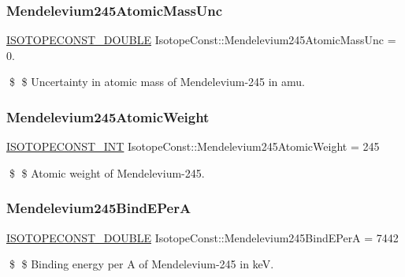 \subsubsection{\texorpdfstring{Mendelevium245\+Atomic\+Mass\+Unc}{Mendelevium245AtomicMassUnc}}
{\footnotesize\ttfamily \mbox{\hyperlink{group___isotope_const-_macros_ga8f45a7272ce02c0b4c65c44636ed719a}{I\+S\+O\+T\+O\+P\+E\+C\+O\+N\+S\+T\+\_\+\+D\+O\+U\+B\+LE}} Isotope\+Const\+::\+Mendelevium245\+Atomic\+Mass\+Unc = 0.}

\$ \$ Uncertainty in atomic mass of Mendelevium-\/245 in amu. \mbox{\label{group___isotope_const-_mendelevium-_md245_gaf616d365d0a048e089cbad421ae89f7b}} 
\subsubsection{\texorpdfstring{Mendelevium245\+Atomic\+Weight}{Mendelevium245AtomicWeight}}
{\footnotesize\ttfamily \mbox{\hyperlink{group___isotope_const-_macros_ga5f18360b3e99483a35c32d789e62621c}{I\+S\+O\+T\+O\+P\+E\+C\+O\+N\+S\+T\+\_\+\+I\+NT}} Isotope\+Const\+::\+Mendelevium245\+Atomic\+Weight = 245}

\$ \$ Atomic weight of Mendelevium-\/245. \mbox{\label{group___isotope_const-_mendelevium-_md245_ga6207192986e74acf7e0187cd17af0da1}} 
\subsubsection{\texorpdfstring{Mendelevium245\+Bind\+E\+PerA}{Mendelevium245BindEPerA}}
{\footnotesize\ttfamily \mbox{\hyperlink{group___isotope_const-_macros_ga8f45a7272ce02c0b4c65c44636ed719a}{I\+S\+O\+T\+O\+P\+E\+C\+O\+N\+S\+T\+\_\+\+D\+O\+U\+B\+LE}} Isotope\+Const\+::\+Mendelevium245\+Bind\+E\+PerA = 7442}

\$ \$ Binding energy per A of Mendelevium-\/245 in keV. \mbox{\label{group___isotope_const-_mendelevium-_md245_gaea430c7d578af6388554776c7f9483ba}} 
